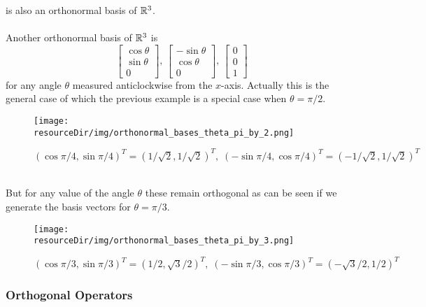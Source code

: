 \documentclass[../MathsNotesBase.tex]{subfiles}
\begin{document}
{		is also an orthonormal basis of $\mathbb{R}^{3}$.\\\\
		Another orthonormal basis of $\mathbb{R}^{3}$ is
		\[ \begin{bmatrix}\cos\theta\\\sin\theta\\0\end{bmatrix},\, \begin{bmatrix}-\sin\theta\\\cos\theta\\0\end{bmatrix},\, \begin{bmatrix}0\\0\\1\end{bmatrix} \]
		for any angle $\theta$ measured anticlockwise from the $x$-axis. Actually this is the general case of which the previous example is a special case when ${ \theta = \pi / 2 }$.
		\pagebreak	
		\begin{figure}[h!]
			\texttt{[image: \\resourceDir/img/orthonormal\_bases\_theta\_pi\_by\_2.png]}
			\caption{$ (\cos{\pi/4}, \sin{\pi/4})^T = (1/\sqrt{2}, 1/\sqrt{2})^T,\;  (-\sin{\pi/4}, \cos{\pi/4})^T = (-1/\sqrt{2}, 1/\sqrt{2})^T $}
		\end{figure}
		\\But for any value of the angle $\theta$ these remain orthogonal as can be seen if we generate the basis vectors for ${ \theta = \pi/3 }$.
		\begin{figure}[h!]
			\texttt{[image: \\resourceDir/img/orthonormal\_bases\_theta\_pi\_by\_3.png]}
			\caption{$ (\cos{\pi/3}, \sin{\pi/3})^T = (1/2, \sqrt{3}/2)^T,\;  (-\sin{\pi/3}, \cos{\pi/3})^T = (-\sqrt{3}/2, 1/2)^T $}
		\end{figure}
		\clearpage
	

		\subsubsection{Orthogonal Operators}
		\bigskip
	
}
\end{document}
